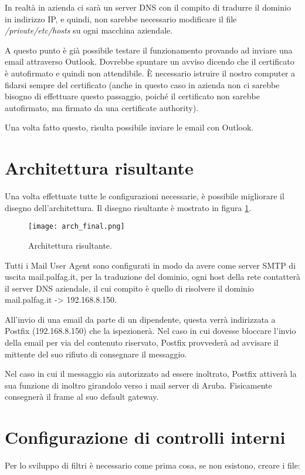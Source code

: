     
    In realtà in azienda ci sarà un server DNS con il compito di tradurre il dominio in indirizzo IP, 
    e quindi, non sarebbe necessario modificare il file \textit{/private/etc/hosts} su ogni macchina aziendale.


    A questo punto è già possibile testare il funzionamento provando ad inviare una email attraverso Outlook. 
    Dovrebbe spuntare un avviso dicendo che il certificato è autofirmato e quindi non attendibile. 
    È necessario istruire il nostro computer a fidarsi sempre del certificato
    (anche in questo caso in azienda non ci sarebbe bisogno di effettuare questo passaggio, poiché 
    il certificato non sarebbe autofirmato, ma firmato da una certificate authority).

    Una volta fatto questo, risulta possibile inviare le email con Outlook.


    \section{Architettura risultante}
    Una volta effettuate tutte le configurazioni necessarie, è possibile migliorare il disegno dell’architettura. 
    Il disegno risultante è mostrato in figura \ref{archFinal}.

    \begin{figure}[htp]
        \centering
        \texttt{[image: arch\_final.png]}
        \caption{Architettura risultante.}\label{archFinal}
    \end{figure} 

    Tutti i Mail User Agent sono configurati in modo da avere come server SMTP di uscita mail.palfag.it, 
    per la traduzione del dominio, ogni host della rete contatterà il server DNS aziendale, il cui compito è
    quello di risolvere il dominio mail.palfag.it -> 192.168.8.150.

    All'invio di una email da parte di un dipendente, questa verrà indirizzata a Postfix (192.168.8.150) che la 
    ispezionerà. Nel caso in cui dovesse bloccare l’invio della email per via del contenuto riservato, 
    Postfix provvederà ad avvisare il mittente del suo rifiuto di consegnare il messaggio.

    Nel caso in cui il messaggio sia autorizzato ad essere inoltrato, Postfix attiverà la sua funzione di inoltro 
    girandolo verso i mail server di Aruba. Fisicamente consegnerà il frame al suo default gateway.

    \section{Configurazione di controlli interni}
    Per lo sviluppo di filtri è necessario come prima cosa, se non esistono, creare i file:

